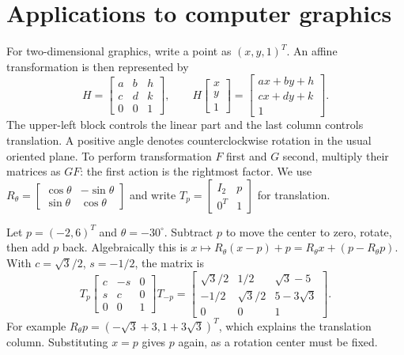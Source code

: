 \section{Applications to computer graphics}
For two-dimensional graphics, write a point as $(x,y,1)^T$. An affine
transformation is then represented by
\[
 H=\begin{bmatrix}a&b&h\\c&d&k\\0&0&1\end{bmatrix},\qquad
 H\begin{bmatrix}x\\y\\1\end{bmatrix}
 =\begin{bmatrix}ax+by+h\\cx+dy+k\\1\end{bmatrix}.
\]
The upper-left block controls the linear part and the last column controls
translation. A positive angle denotes counterclockwise rotation in the
usual oriented plane. To perform transformation $F$ first and $G$ second,
multiply their matrices as $GF$: the first action is the rightmost factor.
We use $R_\theta=\begin{bmatrix}\cos\theta&-\sin\theta\\
\sin\theta&\cos\theta\end{bmatrix}$ and write
$T_p=\begin{bmatrix}I_2&p\\0^T&1\end{bmatrix}$ for translation.

Let $p=(-2,6)^T$ and $\theta=-30^\circ$. Subtract $p$ to move the center
to zero, rotate, then add $p$ back. Algebraically this is
$x\mapsto R_\theta(x-p)+p=R_\theta x+(p-R_\theta p)$.
With $c=\sqrt3/2$, $s=-1/2$, the matrix is
\[
 T_p\begin{bmatrix}c&-s&0\\s&c&0\\0&0&1\end{bmatrix}T_{-p}
 =\boxed{\begin{bmatrix}
 \sqrt3/2&1/2&\sqrt3-5\\-1/2&\sqrt3/2&5-3\sqrt3\\0&0&1
 \end{bmatrix}}.
\]
For example $R_\theta p=(-\sqrt3+3,1+3\sqrt3)^T$, which explains the
translation column. Substituting $x=p$ gives $p$ again, as a rotation center
must be fixed.

